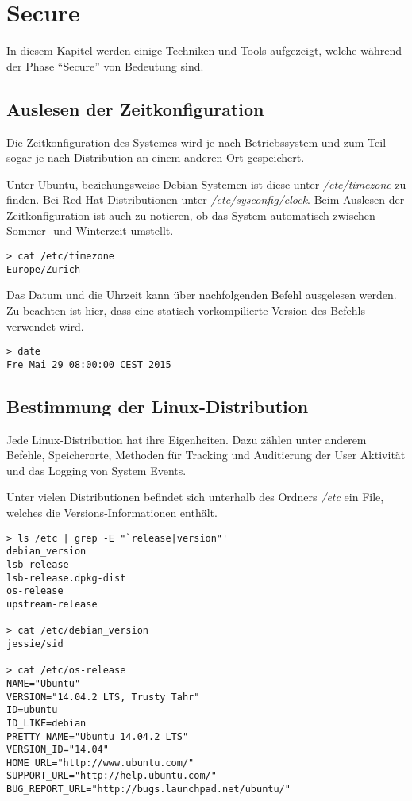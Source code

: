 \section{Secure}
In diesem Kapitel werden einige Techniken und Tools aufgezeigt, welche während der Phase "`Secure"' von Bedeutung sind. 


\subsection{Auslesen der Zeitkonfiguration}
Die Zeitkonfiguration des Systemes wird je nach Betriebssystem und zum Teil sogar je nach Distribution an einem anderen Ort gespeichert.

Unter Ubuntu, beziehungsweise Debian-Systemen ist diese unter \textit{/etc/timezone} zu finden. Bei Red-Hat-Distributionen unter \textit{/etc/sysconfig/clock}.
Beim Auslesen der Zeitkonfiguration ist auch zu notieren, ob das System automatisch zwischen Sommer- und Winterzeit umstellt.

\begin{lstlisting}
> cat /etc/timezone
Europe/Zurich
\end{lstlisting}

Das Datum und die Uhrzeit kann über nachfolgenden Befehl ausgelesen werden. Zu beachten ist hier, dass eine statisch vorkompilierte Version des Befehls verwendet wird.
\begin{lstlisting}
> date
Fre Mai 29 08:00:00 CEST 2015
\end{lstlisting}


\subsection{Bestimmung der Linux-Distribution}
Jede Linux-Distribution hat ihre Eigenheiten. Dazu zählen unter anderem Befehle, Speicherorte, Methoden für Tracking und Auditierung der User Aktivität und das Logging von System Events.

Unter vielen Distributionen befindet sich unterhalb des Ordners \textit{/etc} ein File, welches die Versions-Informationen enthält.\\
\begin{lstlisting}
> ls /etc | grep -E "`release|version"'
debian_version
lsb-release
lsb-release.dpkg-dist
os-release
upstream-release

> cat /etc/debian_version
jessie/sid

> cat /etc/os-release
NAME="Ubuntu"
VERSION="14.04.2 LTS, Trusty Tahr"
ID=ubuntu
ID_LIKE=debian
PRETTY_NAME="Ubuntu 14.04.2 LTS"
VERSION_ID="14.04"
HOME_URL="http://www.ubuntu.com/"
SUPPORT_URL="http://help.ubuntu.com/"
BUG_REPORT_URL="http://bugs.launchpad.net/ubuntu/"
\end{lstlisting}

